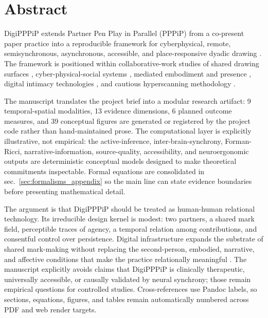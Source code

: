 \documentclass[
  english,
]{article}
\begin{document}
\section{Abstract}\label{sec:abstract}

DigiPPPiP extends Partner Pen Play in Parallel (PPPiP) from a co-present
paper practice into a reproducible framework for cyberphysical, remote,
semisynchronous, asynchronous, accessible, and place-responsive dyadic
drawing \citep{mikhailova2018pppip}. The framework is positioned within
collaborative-work studies of shared drawing surfaces
\citep{tang1991collaborativework}, cyber-physical-social systems
\citep{sobb2023cpss}, mediated embodiment and presence
\citep{biocca1997cyborg, lee2004presence}, digital intimacy technologies
\citep{hassenzahl2012love, neustaedter2012intimacy}, and cautious
hyperscanning methodology
\citep{czeszumski2020hyperscanning, hamilton2021hyperscanning}.

The manuscript translates the project brief into a modular research
artifact: 9 temporal-spatial modalities, 13 evidence dimensions, 6
planned outcome measures, and 39 conceptual figures are generated or
registered by the project code rather than hand-maintained prose. The
computational layer is explicitly illustrative, not empirical: the
active-inference, inter-brain-synchrony, Forman-Ricci,
narrative-information, source-quality, accessibility, and neuroergonomic
outputs are deterministic conceptual models designed to make theoretical
commitments inspectable. Formal equations are consolidated in
sec.~\ref{sec:formalisms_appendix} so the main line can state evidence
boundaries before presenting mathematical detail.

The argument is that DigiPPPiP should be treated as human-human
relational technology. Its irreducible design kernel is modest: two
partners, a shared mark field, perceptible traces of agency, a temporal
relation among contributions, and consentful control over persistence.
Digital infrastructure expands the substrate of shared mark-making
without replacing the second-person, embodied, narrative, and affective
conditions that make the practice relationally meaningful
\citep{schilbach2013secondperson, bolis2024secondperson, vaisvaser2024neurodynamics}.
The manuscript explicitly avoids claims that DigiPPPiP is clinically
therapeutic, universally accessible, or causally validated by neural
synchrony; those remain empirical questions for controlled studies.
Cross-references use Pandoc labels, so sections, equations, figures, and
tables remain automatically numbered across PDF and web render targets.
\end{document}
